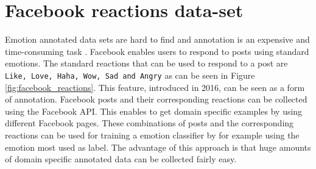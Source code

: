 \documentclass[11pt]{article}
\begin{document}


  
  
\newpage  
\section{Facebook reactions data-set}
Emotion annotated data sets are hard to find and annotation is an expensive and time-consuming task \cite{kim2010evaluation}. Facebook enables users to respond to posts using standard emotions. The standard reactions that can be used to respond to a post are \texttt{Like, Love, Haha, Wow, Sad and Angry} as can be seen in Figure \ref{fig:facebook_reactions}. This feature, introduced in 2016, can be seen as a form of annotation. Facebook posts and their corresponding reactions can be collected using the Facebook API. This enables to get domain specific examples by using different Facebook pages. These combinations of posts and the corresponding reactions can be used for training a emotion classifier by for example using the emotion most used as label. The advantage of this approach is that huge amounts of domain specific annotated data can be collected fairly easy. 
\end{document}
